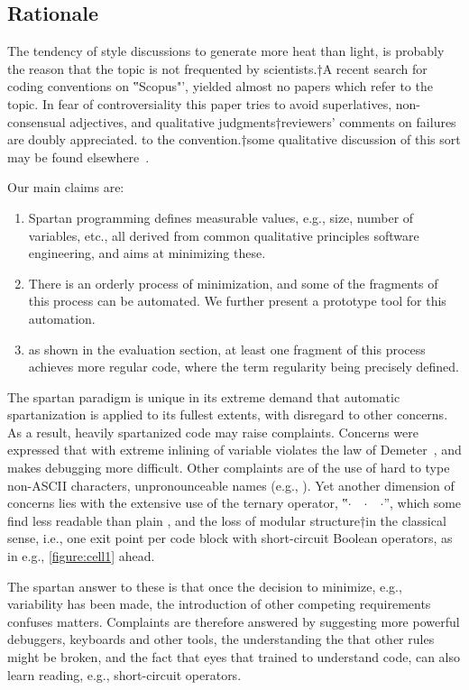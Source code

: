 \subsection{Rationale}

The tendency of style discussions to generate more heat than light, is probably
the reason that the topic is not frequented by scientists.†{A recent search for
coding conventions on ‟Scopus"', yielded almost no papers which refer to the
topic.} In fear of controversiality this paper tries to avoid superlatives,
non-consensual adjectives, and qualitative judgments†{reviewers' comments on
failures are doubly appreciated.} to the convention.†{some qualitative
discussion of this sort may be found elsewhere~\cite{Gil:2010}.}

 Our main claims are:
\begin{enumerate}
    \item Spartan programming defines measurable values, e.g., size, number of
      variables, etc., all derived from common qualitative principles
        software engineering, and aims at minimizing these.
    \item There is an orderly process of minimization,
      and some of the fragments of this process can be automated.
     We further present a prototype tool for this automation.
    \item as shown in the evaluation section, at least one fragment of this
      process achieves more regular code, where the term regularity being
      precisely defined.
\end{enumerate}

 The spartan paradigm is unique in its extreme demand that automatic
  spartanization is applied to its fullest extents, with disregard
  to other concerns.
As a result, heavily spartanized code may raise complaints.
Concerns were expressed that with extreme inlining of variable
violates the law of Demeter~\cite{Lieberherr:96}, and makes debugging more difficult.
Other complaints are of the use of hard to type non-ASCII characters,
  unpronounceable names (e.g., ).
Yet another dimension of concerns lies with the extensive
  use of the ternary operator, ‟$·$~~$·$~\cc{:}~$·$”, which some find
  less readable than plain , and the loss of modular
  structure†{in the classical sense, i.e., one exit point per
  code block} with short-circuit Boolean operators, as in e.g., \cref{figure:cell1}
  ahead.

The spartan answer to these is that once the decision to minimize, e.g.,
  variability has been made, the introduction of other competing requirements
  confuses matters.
Complaints are therefore answered by suggesting more powerful
  debuggers, keyboards and other tools, the understanding the
  that other rules might be broken, and the fact that eyes that
  trained to understand code, can also learn reading, e.g., short-circuit
  operators.

